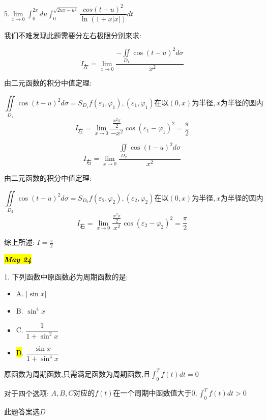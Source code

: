 5.$\lim\limits_{x\rightarrow 0 }\int_{0}^{2x}du\int_{0}^{\sqrt{2ux-u^2}}\dfrac{cos(t-u)^2}{\ln(1+x|x|)}dt$
\begin{solution}
	
	我们不难发现此题需要分左右极限分别来求: 
	
	$$I_{\text{左}}=\lim\limits_{x\rightarrow 0 }\frac{-\iint\limits_{D_{1}}\cos(t-u)^2d\sigma}{-x^2}$$
	
	由二元函数的积分中值定理: 
	
	$$\iint\limits_{D_{1}}\cos(t-u)^2d\sigma=S_{D_{1}}f(\varepsilon_{1},\varphi_{1}),(\varepsilon_{1},\varphi_{1})\text{在以}(0,x)\text{为半径},x
	\text{为半径的圆内}$$
	$$I_{\text{左}}=\lim\limits_{x\rightarrow 0 }\frac{\frac{x^2\pi}{2}}{-x^2}\cos(\varepsilon_{1}-\varphi_{1})^2=\frac{\pi}{2}$$
	
	$$I_{\text{右}}=\lim\limits_{x\rightarrow 0 }\frac{\iint\limits_{D_{2}}\cos(t-u)^2d\sigma}{x^2}$$
	
	由二元函数的积分中值定理: 
	
	$$\iint\limits_{D_{2}}\cos(t-u)^2d\sigma=S_{D_{2}}f(\varepsilon_{2},\varphi_{2}),(\varepsilon_{2},\varphi_{2})\text{在以}(0,x)\text{为半径},x
	\text{为半径的圆内}$$
	$$I_{\text{右}}=\lim\limits_{x\rightarrow 0 }\frac{\frac{x^2\pi}{2}}{x^2}\cos(\varepsilon_{2}-\varphi_{2})^2=\frac{\pi}{2}$$
	
	综上所述: $I=\frac{\pi}{2}$
\end{solution}


\hl{\textbf{\textit{May 24}}}

1. 下列函数中原函数必为周期函数的是: 

\begin{itemize}
	\item A. $|\sin x|$ 
	\item B. $\sin^4 x$ 
	\item C. $\dfrac{1}{1+\sin^2x}$ 
	\item \hl{D}. $\dfrac{\sin x}{1+\sin^4 x}$ 
\end{itemize}
\begin{solution}
	
	原函数为周期函数,只需满足函数为周期函数,且$\int_{0}^{T}f(t)dt=0$
	
	对于四个选项: $A,B,C\text{对应的}f(t)\text{在一个周期中函数值大于0},\int_{0}^{T}f(t)dt>0$
	
	此题答案选$D$
\end{solution}


